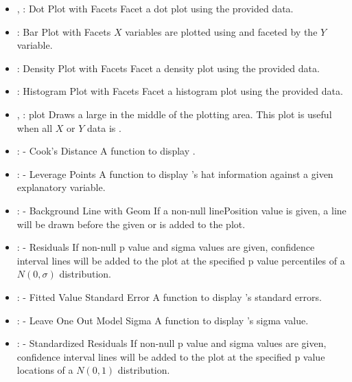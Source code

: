 \documentclass[stat,dissertation]{puthesis}\usepackage[]{graphicx}\usepackage{xcolor}
\newcommand{\tick}{\item[-]}
\begin{document}
\begin{itemize}
  \tick {}, : Dot Plot with Facets \newline Facet a dot plot using the provided data.
  \tick {}: Bar Plot with Facets \newline $X$ variables are plotted using  and faceted by the $Y$ variable.
  \tick {}: Density Plot with Facets \newline Facet a density plot using the provided data.
  \tick {}: Histogram Plot with Facets \newline Facet a histogram plot using the provided data.
  \tick {}, :  plot \newline Draws a large  in the middle of the plotting area. This plot is useful when all $X$ or $Y$ data is .
  \tick {}:  - Cook’s Distance \newline A function to display .
  \tick {}:  - Leverage Points \newline A function to display ’s hat information against a given explanatory variable.
  \tick {}:  - Background Line with Geom \newline If a non-null linePosition value is given, a line will be drawn before the given  or  is added to the plot.
  \tick {}:  - Residuals \newline If non-null p value and sigma values are given, confidence interval lines will be added to the plot at the specified p value percentiles of a $N(0, \sigma)$ distribution.
  \tick {}:  - Fitted Value Standard Error \newline A function to display ’s standard errors.
  \tick {}:  - Leave One Out Model Sigma \newline A function to display ’s sigma value.
  \tick {}:  - Standardized Residuals \newline If non-null p value and sigma values are given, confidence interval lines will be added to the plot at the specified p value locations of a $N(0, 1)$ distribution.

\end{itemize}
\end{document}
